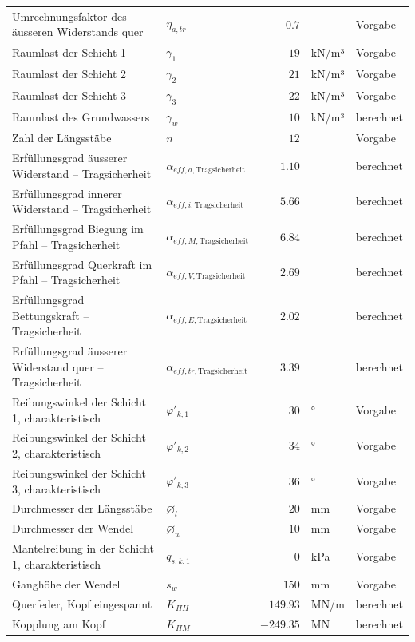 \documentclass[11pt,a4paper]{article}
\begin{document}
\begin{xltabular}{\linewidth}{>{\raggedright\arraybackslash}Xlrll}
Umrechnungsfaktor des äusseren Widerstands quer & $\eta_{a,tr}$ & $0.7$ &  & Vorgabe \\
Raumlast der Schicht 1 & $\gamma_{1}$ & $19$ & kN/m³ & Vorgabe \\
Raumlast der Schicht 2 & $\gamma_{2}$ & $21$ & kN/m³ & Vorgabe \\
Raumlast der Schicht 3 & $\gamma_{3}$ & $22$ & kN/m³ & Vorgabe \\
Raumlast des Grundwassers & $\gamma_w$ & $10$ & kN/m³ & berechnet \\
Zahl der Längsstäbe & $n$ & $12$ &  & Vorgabe \\
Erfüllungsgrad äusserer Widerstand – Tragsicherheit & $\alpha_{eff,a,\text{Tragsicherheit}}$ & $1.10$ &  & berechnet \\
Erfüllungsgrad innerer Widerstand – Tragsicherheit & $\alpha_{eff,i,\text{Tragsicherheit}}$ & $5.66$ &  & berechnet \\
Erfüllungsgrad Biegung im Pfahl – Tragsicherheit & $\alpha_{eff,M,\text{Tragsicherheit}}$ & $6.84$ &  & berechnet \\
Erfüllungsgrad Querkraft im Pfahl – Tragsicherheit & $\alpha_{eff,V,\text{Tragsicherheit}}$ & $2.69$ &  & berechnet \\
Erfüllungsgrad Bettungskraft – Tragsicherheit & $\alpha_{eff,E,\text{Tragsicherheit}}$ & $2.02$ &  & berechnet \\
Erfüllungsgrad äusserer Widerstand quer – Tragsicherheit & $\alpha_{eff,tr,\text{Tragsicherheit}}$ & $3.39$ &  & berechnet \\
Reibungswinkel der Schicht 1, charakteristisch & $\varphi'_{k,1}$ & $30$ & ° & Vorgabe \\
Reibungswinkel der Schicht 2, charakteristisch & $\varphi'_{k,2}$ & $34$ & ° & Vorgabe \\
Reibungswinkel der Schicht 3, charakteristisch & $\varphi'_{k,3}$ & $36$ & ° & Vorgabe \\
Durchmesser der Längsstäbe & $\varnothing_l$ & $20$ & mm & Vorgabe \\
Durchmesser der Wendel & $\varnothing_w$ & $10$ & mm & Vorgabe \\
Mantelreibung in der Schicht 1, charakteristisch & $q_{s,k,1}$ & $0$ & kPa & Vorgabe \\
Ganghöhe der Wendel & $s_w$ & $150$ & mm & Vorgabe \\
Querfeder, Kopf eingespannt & $K_{HH}$ & $149.93$ & MN/m & berechnet \\
Kopplung am Kopf & $K_{HM}$ & $-249.35$ & MN & berechnet \\

\end{xltabular}
\end{document}
